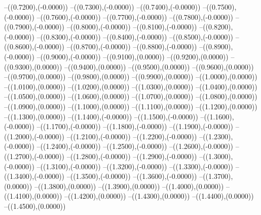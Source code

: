 {	--({\sx*(0.7200)},{\sy*(-0.0000)})
	--({\sx*(0.7300)},{\sy*(-0.0000)})
	--({\sx*(0.7400)},{\sy*(-0.0000)})
	--({\sx*(0.7500)},{\sy*(-0.0000)})
	--({\sx*(0.7600)},{\sy*(-0.0000)})
	--({\sx*(0.7700)},{\sy*(-0.0000)})
	--({\sx*(0.7800)},{\sy*(-0.0000)})
	--({\sx*(0.7900)},{\sy*(-0.0000)})
	--({\sx*(0.8000)},{\sy*(-0.0000)})
	--({\sx*(0.8100)},{\sy*(-0.0000)})
	--({\sx*(0.8200)},{\sy*(-0.0000)})
	--({\sx*(0.8300)},{\sy*(-0.0000)})
	--({\sx*(0.8400)},{\sy*(-0.0000)})
	--({\sx*(0.8500)},{\sy*(-0.0000)})
	--({\sx*(0.8600)},{\sy*(-0.0000)})
	--({\sx*(0.8700)},{\sy*(-0.0000)})
	--({\sx*(0.8800)},{\sy*(-0.0000)})
	--({\sx*(0.8900)},{\sy*(-0.0000)})
	--({\sx*(0.9000)},{\sy*(-0.0000)})
	--({\sx*(0.9100)},{\sy*(0.0000)})
	--({\sx*(0.9200)},{\sy*(0.0000)})
	--({\sx*(0.9300)},{\sy*(0.0000)})
	--({\sx*(0.9400)},{\sy*(0.0000)})
	--({\sx*(0.9500)},{\sy*(0.0000)})
	--({\sx*(0.9600)},{\sy*(0.0000)})
	--({\sx*(0.9700)},{\sy*(0.0000)})
	--({\sx*(0.9800)},{\sy*(0.0000)})
	--({\sx*(0.9900)},{\sy*(0.0000)})
	--({\sx*(1.0000)},{\sy*(0.0000)})
	--({\sx*(1.0100)},{\sy*(0.0000)})
	--({\sx*(1.0200)},{\sy*(0.0000)})
	--({\sx*(1.0300)},{\sy*(0.0000)})
	--({\sx*(1.0400)},{\sy*(0.0000)})
	--({\sx*(1.0500)},{\sy*(0.0000)})
	--({\sx*(1.0600)},{\sy*(0.0000)})
	--({\sx*(1.0700)},{\sy*(0.0000)})
	--({\sx*(1.0800)},{\sy*(0.0000)})
	--({\sx*(1.0900)},{\sy*(0.0000)})
	--({\sx*(1.1000)},{\sy*(0.0000)})
	--({\sx*(1.1100)},{\sy*(0.0000)})
	--({\sx*(1.1200)},{\sy*(0.0000)})
	--({\sx*(1.1300)},{\sy*(0.0000)})
	--({\sx*(1.1400)},{\sy*(-0.0000)})
	--({\sx*(1.1500)},{\sy*(-0.0000)})
	--({\sx*(1.1600)},{\sy*(-0.0000)})
	--({\sx*(1.1700)},{\sy*(-0.0000)})
	--({\sx*(1.1800)},{\sy*(-0.0000)})
	--({\sx*(1.1900)},{\sy*(-0.0000)})
	--({\sx*(1.2000)},{\sy*(-0.0000)})
	--({\sx*(1.2100)},{\sy*(-0.0000)})
	--({\sx*(1.2200)},{\sy*(-0.0000)})
	--({\sx*(1.2300)},{\sy*(-0.0000)})
	--({\sx*(1.2400)},{\sy*(-0.0000)})
	--({\sx*(1.2500)},{\sy*(-0.0000)})
	--({\sx*(1.2600)},{\sy*(-0.0000)})
	--({\sx*(1.2700)},{\sy*(-0.0000)})
	--({\sx*(1.2800)},{\sy*(-0.0000)})
	--({\sx*(1.2900)},{\sy*(-0.0000)})
	--({\sx*(1.3000)},{\sy*(-0.0000)})
	--({\sx*(1.3100)},{\sy*(-0.0000)})
	--({\sx*(1.3200)},{\sy*(-0.0000)})
	--({\sx*(1.3300)},{\sy*(-0.0000)})
	--({\sx*(1.3400)},{\sy*(-0.0000)})
	--({\sx*(1.3500)},{\sy*(-0.0000)})
	--({\sx*(1.3600)},{\sy*(-0.0000)})
	--({\sx*(1.3700)},{\sy*(0.0000)})
	--({\sx*(1.3800)},{\sy*(0.0000)})
	--({\sx*(1.3900)},{\sy*(0.0000)})
	--({\sx*(1.4000)},{\sy*(0.0000)})
	--({\sx*(1.4100)},{\sy*(0.0000)})
	--({\sx*(1.4200)},{\sy*(0.0000)})
	--({\sx*(1.4300)},{\sy*(0.0000)})
	--({\sx*(1.4400)},{\sy*(0.0000)})
	--({\sx*(1.4500)},{\sy*(0.0000)})
}
